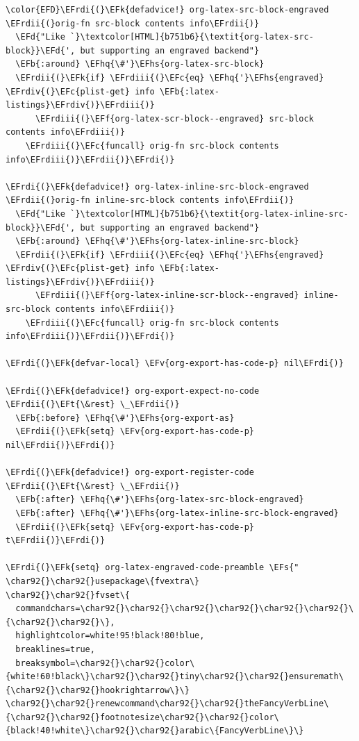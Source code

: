 \documentclass{scrartcl}
\newcommand{\EFk}[1]{\textcolor{EFk}{#1}} %
\newcommand{\EFd}[1]{\textcolor{EFd}{\textit{#1}}} %
\newcommand{\EFt}[1]{\textcolor{EFt}{#1}} %
\newcommand{\EFs}[1]{\textcolor{EFs}{#1}} %
\newcommand{\EFb}[1]{\textcolor{EFb}{#1}} %
\newcommand{\EFc}[1]{\textcolor{EFc}{#1}} %
\newcommand{\EFv}[1]{\textcolor{EFv}{#1}} %
\newcommand{\EFf}[1]{\textcolor{EFf}{#1}} %
\newcommand{\EFhq}[1]{\textcolor{EFhq}{#1}} %
\newcommand{\EFhs}[1]{\textcolor{EFhs}{#1}} %
\newcommand{\EFrdi}[1]{\textcolor{EFrdi}{#1}} %
\newcommand{\EFrdii}[1]{\textcolor{EFrdii}{#1}} %
\newcommand{\EFrdiii}[1]{\textcolor{EFrdiii}{#1}} %
\newcommand{\EFrdiv}[1]{\textcolor{EFrdiv}{#1}} %
\begin{document}
\begin{Code}
\begin{Verbatim}[]
\color{EFD}\EFrdi{(}\EFk{defadvice!} org-latex-src-block-engraved \EFrdii{(}orig-fn src-block contents info\EFrdii{)}
  \EFd{"Like `}\textcolor[HTML]{b751b6}{\textit{org-latex-src-block}}\EFd{', but supporting an engraved backend"}
  \EFb{:around} \EFhq{\#'}\EFhs{org-latex-src-block}
  \EFrdii{(}\EFk{if} \EFrdiii{(}\EFc{eq} \EFhq{'}\EFhs{engraved} \EFrdiv{(}\EFc{plist-get} info \EFb{:latex-listings}\EFrdiv{)}\EFrdiii{)}
      \EFrdiii{(}\EFf{org-latex-scr-block--engraved} src-block contents info\EFrdiii{)}
    \EFrdiii{(}\EFc{funcall} orig-fn src-block contents info\EFrdiii{)}\EFrdii{)}\EFrdi{)}

\EFrdi{(}\EFk{defadvice!} org-latex-inline-src-block-engraved \EFrdii{(}orig-fn inline-src-block contents info\EFrdii{)}
  \EFd{"Like `}\textcolor[HTML]{b751b6}{\textit{org-latex-inline-src-block}}\EFd{', but supporting an engraved backend"}
  \EFb{:around} \EFhq{\#'}\EFhs{org-latex-inline-src-block}
  \EFrdii{(}\EFk{if} \EFrdiii{(}\EFc{eq} \EFhq{'}\EFhs{engraved} \EFrdiv{(}\EFc{plist-get} info \EFb{:latex-listings}\EFrdiv{)}\EFrdiii{)}
      \EFrdiii{(}\EFf{org-latex-inline-scr-block--engraved} inline-src-block contents info\EFrdiii{)}
    \EFrdiii{(}\EFc{funcall} orig-fn src-block contents info\EFrdiii{)}\EFrdii{)}\EFrdi{)}

\EFrdi{(}\EFk{defvar-local} \EFv{org-export-has-code-p} nil\EFrdi{)}

\EFrdi{(}\EFk{defadvice!} org-export-expect-no-code \EFrdii{(}\EFt{\&rest} \_\EFrdii{)}
  \EFb{:before} \EFhq{\#'}\EFhs{org-export-as}
  \EFrdii{(}\EFk{setq} \EFv{org-export-has-code-p} nil\EFrdii{)}\EFrdi{)}

\EFrdi{(}\EFk{defadvice!} org-export-register-code \EFrdii{(}\EFt{\&rest} \_\EFrdii{)}
  \EFb{:after} \EFhq{\#'}\EFhs{org-latex-src-block-engraved}
  \EFb{:after} \EFhq{\#'}\EFhs{org-latex-inline-src-block-engraved}
  \EFrdii{(}\EFk{setq} \EFv{org-export-has-code-p} t\EFrdii{)}\EFrdi{)}

\EFrdi{(}\EFk{setq} org-latex-engraved-code-preamble \EFs{"
\char92{}\char92{}usepackage\{fvextra\}
\char92{}\char92{}fvset\{
  commandchars=\char92{}\char92{}\char92{}\char92{}\char92{}\char92{}\{\char92{}\char92{}\},
  highlightcolor=white!95!black!80!blue,
  breaklines=true,
  breaksymbol=\char92{}\char92{}color\{white!60!black\}\char92{}\char92{}tiny\char92{}\char92{}ensuremath\{\char92{}\char92{}hookrightarrow\}\}
\char92{}\char92{}renewcommand\char92{}\char92{}theFancyVerbLine\{\char92{}\char92{}footnotesize\char92{}\char92{}color\{black!40!white\}\char92{}\char92{}arabic\{FancyVerbLine\}\}


\end{Verbatim}
\end{Code}
\end{document}
